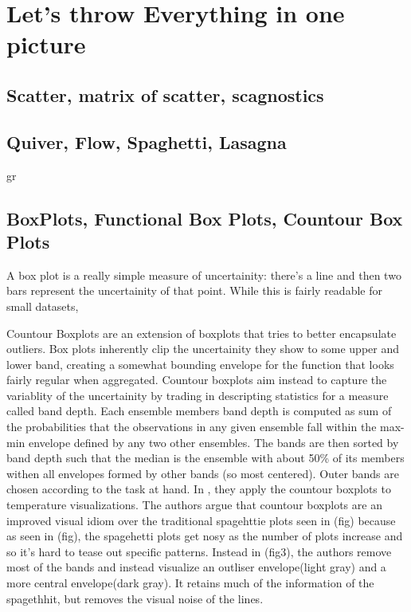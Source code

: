 \documentclass[letterpaper,onecolumn,titlepage]{Ythesis}
\begin{document}
\section{Let's throw Everything in one picture}                                                        
\subsection{Scatter, matrix of scatter, scagnostics}                                        
\subsection{Quiver, Flow, Spaghetti, Lasagna}

gr


\subsection{BoxPlots, Functional Box Plots, Countour Box Plots}                                      
A box plot is a really simple measure of uncertainity: there's a line and then two bars represent the uncertainity of that point. %
While this is fairly readable for small datasets, %




Countour Boxplots \cite{Whitaker2013} are an extension of boxplots that tries to better encapsulate outliers. Box plots inherently clip the uncertainity they show to some upper and lower band, 
creating a somewhat bounding envelope for the function that looks fairly regular when aggregated. Countour boxplots aim instead to capture the variablity of the uncertainity by trading in descripting
statistics for a measure called band depth. Each ensemble members band depth is computed as sum of the probabilities that the observations in any given ensemble fall within the max-min envelope defined by any two other ensembles. The bands are then sorted by band depth such that the median is the ensemble with about 50\% of its members withen all envelopes formed by other bands (so most centered). Outer bands are chosen according to the task at hand. In \cite{Whitaker2013}, they apply the countour boxplots to temperature visualizations. %
The authors argue that countour boxplots are an improved visual idiom over the traditional spagehttie plots seen in (fig) because as seen in (fig), the spagehetti plots get nosy as the number of plots increase and so it's hard to tease out specific patterns. Instead in (fig3), the authors remove most of the bands and instead visualize an outliser envelope(light gray) and a more central envelope(dark gray). It retains much of the information of the spagethhit, but removes the visual noise of the lines.  
\end{document}
